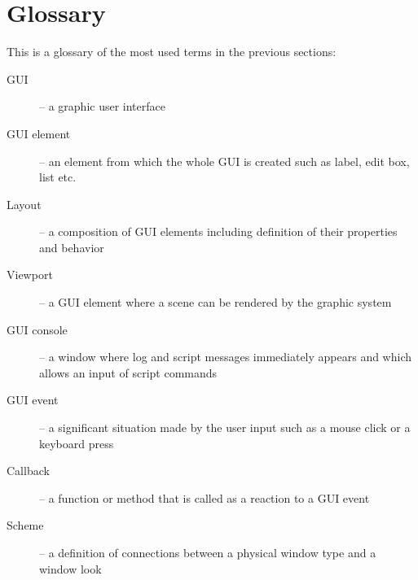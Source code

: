 \documentclass[a4paper, 12pt]{report}
\begin{document}
\section{Glossary}
This is a glossary of the most used terms in the previous sections:

\begin{description}
  \item[GUI] -- a graphic user interface
  \item[GUI element] -- an element from which the whole GUI is created such as label, edit box, list etc.
  \item[Layout] -- a composition of GUI elements including definition of their properties and behavior
  \item[Viewport] -- a GUI element where a scene can be rendered by the graphic system
  \item[GUI console] -- a window where log and script messages immediately appears and which allows an input of script commands
  \item[GUI event] -- a significant situation made by the user input such as a mouse click or a keyboard press
  \item[Callback] -- a function or method that is called as a reaction to a GUI event
  \item[Scheme] -- a definition of connections between a physical window type and a window look
\end{description}


\end{document}
